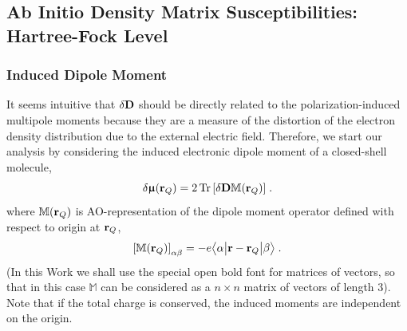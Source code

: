 \documentclass[aip,amsmath,amssymb,reprint,floatfix]{revtex4-1}
\newcommand{\tbraket}[3]{\ensuremath{\bigl\langle {#1} \bigl\lvert {#2} \bigl\lvert {#3} \bigr\rangle}}
\newcommand{\BM}[1]{\bm{#1}}
\DeclareMathOperator{\Tr}{Tr}
\begin{document}
\subsection{Ab Initio Density Matrix Susceptibilities: Hartree-Fock Level}

\subsubsection{Induced Dipole Moment}

It seems intuitive that $\delta {\bf D}$ should 
be directly related to the
polarization\hyp{}induced multipole moments because they are
a measure of the distortion of the electron density distribution due to the external electric
field. 
Therefore, 
we start our analysis by considering the induced electronic dipole moment 
of a closed-shell molecule, %
%
\begin{equation} \label{e:dmu-exact}
 \delta {\BM{\upmu}}({\bf r}_Q) = 
     2 \Tr{ 
         \left[ 
              \delta {\bf D} {\mathbb{M}({\bf r}_Q)}
         \right] } \;.
\end{equation}
%
where ${\mathbb{M}({\bf r}_Q)}$ is AO\hyp{}representation
of the dipole moment operator defined with respect to origin at ${\bf r}_Q$,
%
\begin{equation}\label{e:m}
 \left[ {\mathbb{M}({\bf r}_Q)} \right]_{\alpha\beta} = -e\tbraket{\alpha}{{\bf r} - {\bf r}_Q}{\beta} \;.
\end{equation}
%
(In this Work we shall use the special open bold font for matrices of vectors, so that
in this case ${\mathbb{M}}$ can be considered as a $n \times n$ matrix of vectors of length 3).
Note that if the total charge is conserved, the induced moments are independent on the origin.
\end{document}
